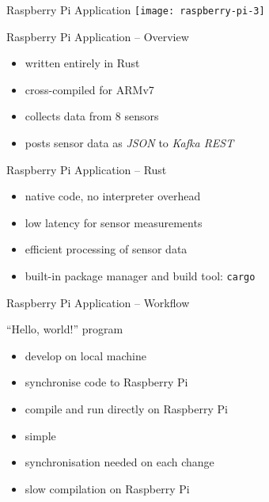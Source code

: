 \begin{frame}{Raspberry Pi Application}
 \centering
 \vspace*{1em}
 \texttt{[image: raspberry-pi-3]}
\end{frame}

\begin{frame}{Raspberry Pi Application -- Overview}
  \begin{itemize}
    \item written entirely in Rust
    \item cross-compiled for ARMv7
    \item collects data from 8 sensors
    \item posts sensor data as \textit{JSON} to \textit{Kafka REST}
  \end{itemize}
\end{frame}

\begin{frame}{Raspberry Pi Application -- Rust}
  \begin{itemize}
    \item native code, no interpreter overhead
    \item low latency for sensor measurements
    \item efficient processing of sensor data
    \item built-in package manager and build tool: \texttt{cargo}
  \end{itemize}
\end{frame}

\begin{frame}{Raspberry Pi Application -- Workflow}
  \begin{block}{“Hello, world!” program}
    \begin{itemize}
      \item develop on local machine
      \item synchronise code to Raspberry Pi
      \item compile and run directly on Raspberry Pi
    \end{itemize}
  \end{block}
  \begin{block}{}
    \begin{itemize}
      \item simple
    \end{itemize}
  \end{block}
  \begin{block}{}
    \begin{itemize}
      \item synchronisation needed on each change
      \item slow compilation on Raspberry Pi
    \end{itemize}
  \end{block}
\end{frame}

